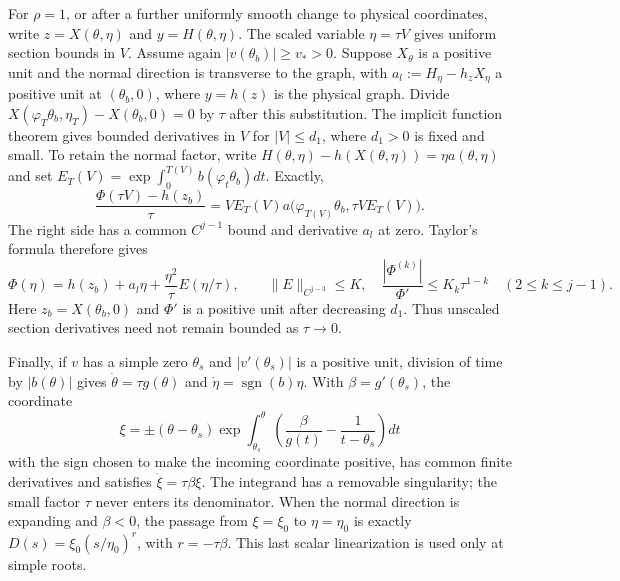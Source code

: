 For $\rho=1$, or after a further uniformly smooth change to physical
coordinates, write $z=X(\theta,\eta)$ and $y=H(\theta,\eta)$.
The scaled variable $\eta=\tau V$ gives uniform section bounds in $V$.
Assume again
$|v(\theta_b)|\ge v_*>0$. Suppose $X_\theta$ is a
positive unit and the normal direction is transverse to the graph,
with $a_l:=H_\eta-h_zX_\eta$ a positive unit at
$(\theta_b,0)$, where $y=h(z)$ is the physical graph. Divide
$X(\varphi_T\theta_b,\eta_T)-X(\theta_b,0)=0$ by $\tau$
after this substitution. The implicit function theorem gives bounded
derivatives in $V$ for $|V|\le d_1$, where $d_1>0$ is fixed and small.
To retain the normal factor, write
$H(\theta,\eta)-h(X(\theta,\eta))=\eta a(\theta,\eta)$ and set
$E_T(V)=\exp\int_0^{T(V)}b(\varphi_t\theta_b)dt$. Exactly,
\[
 \frac{\Phi(\tau V)-h(z_b)}{\tau}
 =V E_T(V)a\bigl(\varphi_{T(V)}\theta_b,\tau V E_T(V)\bigr).
\]
The right side has a common $C^{j-1}$ bound and derivative $a_l$ at zero.
Taylor's formula therefore gives
\begin{equation}\label{eq:uniform-physical-section}
 \Phi(\eta)=h(z_b)+a_l\eta+
       \frac{\eta^2}{\tau}E(\eta/\tau),\qquad
 \|E\|_{C^{j-3}}\le K,
 \quad \frac{|\Phi^{(k)}|}{\Phi'}\le K_k\tau^{1-k}
 \quad(2\le k\le j-1).
\end{equation}
Here $z_b=X(\theta_b,0)$ and $\Phi'$ is a positive unit after
decreasing $d_1$. Thus unscaled section derivatives need not remain
bounded as $\tau\to0$.

Finally, if $v$ has a simple zero $\theta_s$ and
$|v'(\theta_s)|$ is a positive unit, division of time by $|b(\theta)|$
gives $\dot\theta=\tau g(\theta)$ and
$\dot\eta=\operatorname{sgn}(b)\eta$. With
$\beta=g'(\theta_s)$, the coordinate
\[
 \xi=\pm(\theta-\theta_s)
 \exp\int_{\theta_s}^{\theta}
       \left(\frac{\beta}{g(t)}-\frac1{t-\theta_s}\right)dt
\]
with the sign chosen to make the incoming coordinate positive,
has common finite derivatives and satisfies
$\dot\xi=\tau\beta\xi$. The integrand has a removable singularity;
the small factor $\tau$ never enters its denominator. When the normal
direction is expanding and $\beta<0$, the passage from
$\xi=\xi_0$ to $\eta=\eta_0$ is exactly
$D(s)=\xi_0(s/\eta_0)^r$, with $r=-\tau\beta$.
This last scalar linearization is used only at simple roots.
